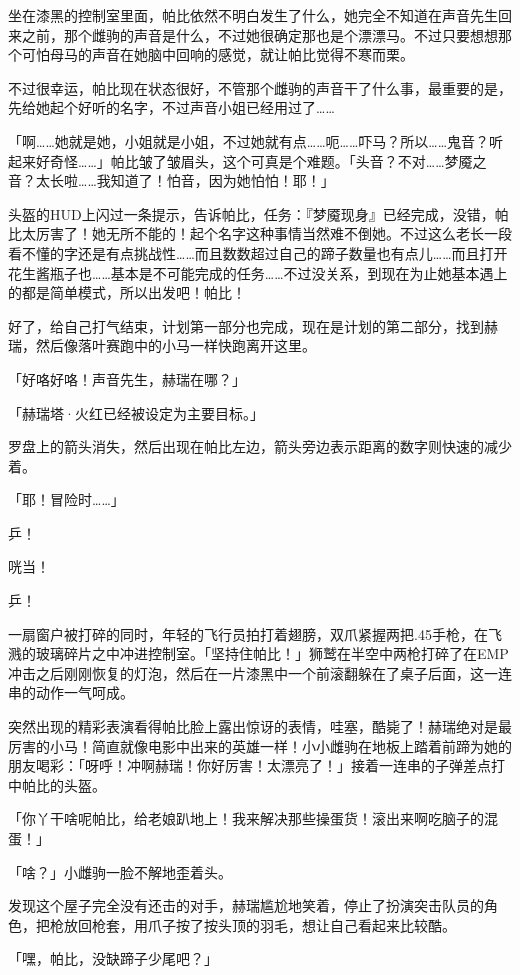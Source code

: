 坐在漆黑的控制室里面，帕比依然不明白发生了什么，她完全不知道在声音先生回来之前，那个雌驹的声音是什么，不过她很确定那也是个漂漂马。不过只要想想那个可怕母马的声音在她脑中回响的感觉，就让帕比觉得不寒而栗。

不过很幸运，帕比现在状态很好，不管那个雌驹的声音干了什么事，最重要的是，先给她起个好听的名字，不过声音小姐已经用过了……

「啊……她就是她，小姐就是小姐，不过她就有点……呃……吓马？所以……鬼音？听起来好奇怪……」帕比皱了皱眉头，这个可真是个难题。「头音？不对……梦魇之音？太长啦……我知道了！怕音，因为她怕怕！耶！」

头盔的HUD上闪过一条提示，告诉帕比，任务：『梦魇现身』已经完成，没错，帕比太厉害了！她无所不能的！起个名字这种事情当然难不倒她。不过这么老长一段看不懂的字还是有点挑战性……而且数数超过自己的蹄子数量也有点儿……而且打开花生酱瓶子也……基本是不可能完成的任务……不过没关系，到现在为止她基本遇上的都是简单模式，所以出发吧！帕比！

好了，给自己打气结束，计划第一部分也完成，现在是计划的第二部分，找到赫瑞，然后像落叶赛跑中的小马一样快跑离开这里。

「好咯好咯！声音先生，赫瑞在哪？」

「{\mt 赫瑞塔·火红已经被设定为主要目标。}」

罗盘上的箭头消失，然后出现在帕比左边，箭头旁边表示距离的数字则快速的减少着。

「耶！冒险时……」

乒！

咣当！

乒！

一扇窗户被打碎的同时，年轻的飞行员拍打着翅膀，双爪紧握两把.45手枪，在飞溅的玻璃碎片之中冲进控制室。「坚持住帕比！」狮鹫在半空中两枪打碎了在EMP冲击之后刚刚恢复的灯泡，然后在一片漆黑中一个前滚翻躲在了桌子后面，这一连串的动作一气呵成。

突然出现的精彩表演看得帕比脸上露出惊讶的表情，哇塞，酷毙了！赫瑞绝对是最厉害的小马！简直就像电影中出来的英雄一样！小小雌驹在地板上踏着前蹄为她的朋友喝彩：「呀呼！冲啊赫瑞！你好厉害！太漂亮了！」接着一连串的子弹差点打中帕比的头盔。

「你丫干啥呢帕比，给老娘趴地上！我来解决那些操蛋货！滚出来啊吃脑子的混蛋！」

「啥？」小雌驹一脸不解地歪着头。

发现这个屋子完全没有还击的对手，赫瑞尴尬地笑着，停止了扮演突击队员的角色，把枪放回枪套，用爪子按了按头顶的羽毛，想让自己看起来比较酷。

「嘿，帕比，没缺蹄子少尾吧？」

